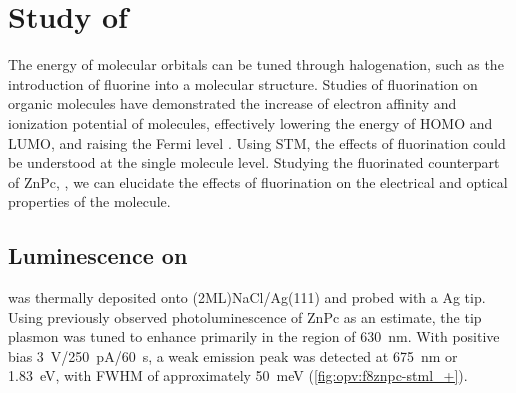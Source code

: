 








\section{Study of }

The energy of molecular orbitals can be tuned through halogenation, such as the introduction of fluorine into a molecular structure. Studies of fluorination on organic molecules have demonstrated the increase of electron affinity and ionization potential of molecules, effectively lowering the energy of HOMO and LUMO, and raising the Fermi level \citep{schwarze2016band,warren2019controlling}. Using \ac{STM}, the effects of fluorination could be understood at the single molecule level. Studying the fluorinated counterpart of ZnPc, , we can elucidate the effects of fluorination on the electrical and optical properties of the molecule.


\subsection{Luminescence on }

 was thermally deposited onto (2ML)NaCl/Ag(111) and probed with a Ag tip. Using previously observed photoluminescence of ZnPc as an estimate, the tip plasmon was tuned to enhance primarily in the region of \SI{630}{nm}. With positive bias \SI{3}{V}/\SI{250}{pA}/\SI{60}{s}, a weak emission peak was detected at \SI{675}{nm} or \SI{1.83}{eV}, with FWHM of approximately \SI{50}{meV} (\autoref{fig:opv:f8znpc-stml_+}).

